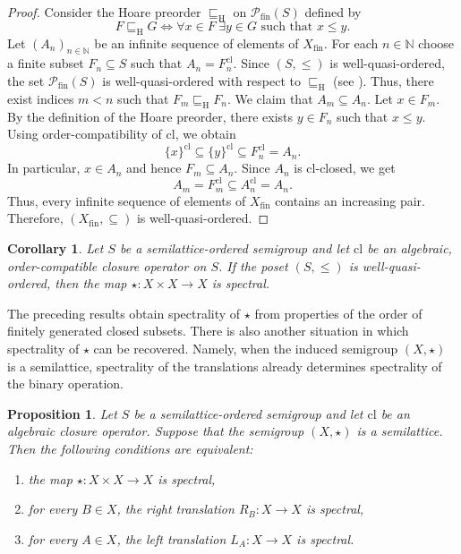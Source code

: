 \documentclass[10pt, reqno]{amsart}
\theoremstyle{plain}
\newtheorem{prop}[theorem]{Proposition}
\newtheorem{corollary}[theorem]{Corollary}
\theoremstyle{definition}
\begin{document}
\begin{proof}
    Consider the Hoare preorder $\sqsubseteq_\mathrm{H}$ on $\mathcal{P}_\mathrm{fin}(S)$ defined by $$F \sqsubseteq_\mathrm{H} G \iff \forall x\in F \hspace{3pt} \exists y\in G \text{ such that } x \leqslant y.$$ Let $(A_n)_{n\in\mathbb{N}}$ be an infinite sequence of elements of $X_\mathrm{fin}$. For each $n\in\mathbb{N}$ choose a finite subset $F_n\subseteq S$ such that $A_n = F_n^\mathrm{cl}$. Since $(S, \leqslant)$ is well-quasi-ordered, the set $\mathcal{P}_\mathrm{fin}(S)$ is well-quasi-ordered with respect to $\sqsubseteq_\mathrm{H}$ (see \cite[Exercise 1.13(4)]{schmitz}). Thus, there exist indices $m < n$ such that $F_m \sqsubseteq_\mathrm{H} F_n$. We claim that $A_m \subseteq A_n$. Let $x\in F_m$. By the definition of the Hoare preorder, there exists $y\in F_n$ such that $x \leqslant y$. Using order-compatibility of $\mathrm{cl}$, we obtain $$\{x\}^\mathrm{cl} \subseteq \{y\}^\mathrm{cl} \subseteq F_n^\mathrm{cl} = A_n.$$ In particular, $x\in A_n$ and hence $F_m \subseteq A_n$. Since $A_n$ is $\mathrm{cl}$-closed, we get $$A_m = F_m^\mathrm{cl} \subseteq A_n^\mathrm{cl} = A_n.$$ Thus, every infinite sequence of elements of $X_\mathrm{fin}$ contains an increasing pair. Therefore, $(X_\mathrm{fin}, \subseteq)$ is well-quasi-ordered.
\end{proof}
\begin{corollary}\label{algebraicity_order_compatibility_and_well_quasi_order_on_original_set_imply_spectrality_of_star}
    Let $S$ be a semilattice-ordered semigroup and let $\mathrm{cl}$ be an algebraic, order-compatible closure operator on $S$. If the poset $(S, \leqslant)$ is well-quasi-ordered, then the map $\star: X \times X \to X$ is spectral. 
\end{corollary}
The preceding results obtain spectrality of $\star$ from properties of the order of finitely generated closed subsets. There is also another situation in which spectrality of $\star$ can be recovered. Namely, when the induced semigroup $(X, \star)$ is a semilattice, spectrality of the translations already determines spectrality of the binary operation. 
\begin{prop}\label{separate_spectrality_implies_joint_for_semilattices}
    Let $S$ be a semilattice-ordered semigroup and let $\mathrm{cl}$ be an algebraic closure operator. Suppose that the semigroup $(X, \star)$ is a semilattice. Then the following conditions are equivalent: 
    \begin{enumerate}[label=(\arabic*)]
        \item the map $\star: X \times X \to X$ is spectral, 
        \item for every $B \in X$, the right translation $R_B: X \to X$ is spectral, 
        \item for every $A \in X$, the left translation $L_A: X \to X$ is spectral. 
    \end{enumerate}
\end{prop}
\end{document}
